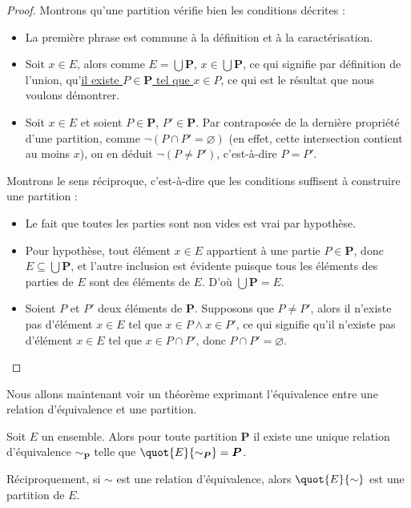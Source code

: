 \begin{proof}
    Montrons qu'une partition vérifie bien les conditions décrites :
    \begin{itemize}[label=$\bullet$]
        \item La première phrase est commune à la définition et à la caractérisation.
        \item Soit $x\in E$, alors comme $\displaystyle{E=\bigcup \boldsymbol P}$, $\displaystyle{x\in\bigcup\boldsymbol P}$, ce qui signifie par définition de l'union, qu'\underline{il existe } \underline{$P\in\boldsymbol P$ tel que $x\in P$}, ce qui est le résultat que nous voulons démontrer.
        \item Soit $x\in E$ et soient $P\in\boldsymbol P$, $P'\in\boldsymbol P$. Par contraposée de la dernière propriété d'une partition, comme $\lnot (P\cap P' =\varnothing)$ (en effet, cette intersection contient au moins $x$), on en déduit $\lnot (P\neq P')$, c'est-à-dire \underline{$P=P'$}.
    \end{itemize}
    
    Montrons le sens réciproque, c'est-à-dire que les conditions suffisent à construire une partition :
    \begin{itemize}[label=$\bullet$]
        \item Le fait que toutes les parties sont non vides est vrai par hypothèse.
        \item Pour hypothèse, tout élément $x\in E$ appartient à une partie $P\in\boldsymbol P$, donc $E\subseteq\displaystyle{\bigcup \boldsymbol P}$, et l'autre inclusion est évidente puisque tous les éléments des parties de $E$ sont des éléments de $E$. D'où \underline{$\displaystyle{\bigcup \boldsymbol P = E}$}.
        \item Soient $P$ et $P'$ deux éléments de $\boldsymbol P$. Supposons que $P\neq P'$, alors il n'existe pas d'élément $x\in E$ tel que $x\in P\land x\in P'$, ce qui signifie qu'il n'existe pas d'élément $x\in E$ tel que $x\in P\cap P'$, donc \underline{$P\cap P'=\varnothing$}.
    \end{itemize}
    
\end{proof}

Nous allons maintenant voir un théorème exprimant l'équivalence entre une relation d'équivalence et une partition.

\begin{them}
    Soit $E$ un ensemble. Alors pour toute partition $\boldsymbol P$ il existe une unique relation d'équivalence $\sim_{\boldsymbol P}$ telle que $\quot{E}{\sim_{\boldsymbol P}} = \boldsymbol P$.
    
    Réciproquement, si $\sim$ est une relation d'équivalence, alors $\quot{E}{\sim}$ est une partition de $E$.
\end{them}

